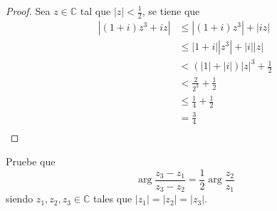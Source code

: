 \documentclass[12pt]{report}
\theoremstyle{largebreak}
\newcommand\abs[1]{\ensuremath{\left|#1\right|}}
\begin{document}
    \begin{proof}
        Sea $z\in\mathbb{C}$ tal que $\abs{z}<\frac{1}{2}$, se tiene que
        \begin{equation*}
            \begin{split}
                \abs{(1+i)z^3+iz}&\leq\abs{(1+i)z^3}+\abs{iz}\\
                &\leq\abs{1+i}\abs{z^3}+\abs{i}\abs{z}\\
                &<(\abs{1}+\abs{i})\abs{z}^3+\frac{1}{2}\\
                &<\frac{2}{2^3}+\frac{1}{2}\\
                &\leq\frac{1}{4}+\frac{1}{2}\\
                &=\frac{3}{4}\\
            \end{split}
        \end{equation*}
    \end{proof}

    \begin{excer}
        Pruebe que
        \begin{equation*}
            \arg\frac{z_3-z_1}{z_3-z_2}=\frac{1}{2}\arg\frac{z_2}{z_1}
        \end{equation*}
        siendo $z_1,z_2,z_3\in\mathbb{C}$ tales que $\abs{z_1}=\abs{z_2}=\abs{z_3}$.
    \end{excer}
\end{document}
